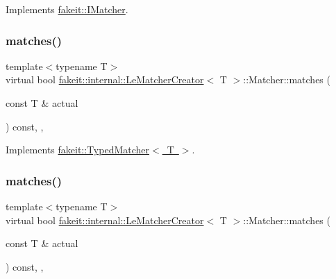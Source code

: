Implements \mbox{\hyperlink{structfakeit_1_1IMatcher_a409d414a042236dc5e05e241dfd24a67}{fakeit\+::\+I\+Matcher}}.

\mbox{\label{structfakeit_1_1internal_1_1LeMatcherCreator_1_1Matcher_a9df22204323939912395f8a4c64d0698}} 
\subsubsection{\texorpdfstring{matches()}{matches()}\hspace{0.1cm}{\footnotesize\ttfamily [1/9]}}
{\footnotesize\ttfamily template$<$typename T$>$ \\
virtual bool \mbox{\hyperlink{structfakeit_1_1internal_1_1LeMatcherCreator}{fakeit\+::internal\+::\+Le\+Matcher\+Creator}}$<$ T $>$\+::Matcher\+::matches (\begin{DoxyParamCaption}\item[{const T \&}]{actual }\end{DoxyParamCaption}) const\hspace{0.3cm}{\ttfamily [inline]}, {\ttfamily [override]}, {\ttfamily [virtual]}}



Implements \mbox{\hyperlink{structfakeit_1_1TypedMatcher_ac553bb6ac7c98a489c92fa6ace0f2e2b}{fakeit\+::\+Typed\+Matcher$<$ T $>$}}.

\mbox{\label{structfakeit_1_1internal_1_1LeMatcherCreator_1_1Matcher_a9df22204323939912395f8a4c64d0698}} 
\subsubsection{\texorpdfstring{matches()}{matches()}\hspace{0.1cm}{\footnotesize\ttfamily [2/9]}}
{\footnotesize\ttfamily template$<$typename T$>$ \\
virtual bool \mbox{\hyperlink{structfakeit_1_1internal_1_1LeMatcherCreator}{fakeit\+::internal\+::\+Le\+Matcher\+Creator}}$<$ T $>$\+::Matcher\+::matches (\begin{DoxyParamCaption}\item[{const T \&}]{actual }\end{DoxyParamCaption}) const\hspace{0.3cm}{\ttfamily [inline]}, {\ttfamily [override]}, {\ttfamily [virtual]}}



